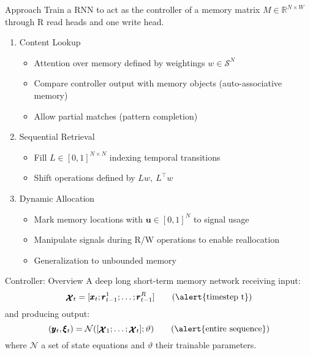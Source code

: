 \documentclass{beamer}
\newcommand{\xx}{\pmb{\raisebox{-1.5pt}{$\mathcal{X}$}}}
\begin{document}
\begin{frame}{Approach}
	Train a RNN to act as the \alert{controller} of a memory matrix $M \in \mathbb{R}^{N\times W}$ through R \alert{read heads} and one \alert{write head}.
	
	\pause
	\begin{enumerate}
	\item \alert{Content Lookup}\\
		\begin{itemize}
		\item \alert{Attention} over memory defined by weightings $w \in \mathcal{S}^N$
		\item Compare controller output with memory objects (\alert{auto-associative memory})
		\item Allow partial matches  (\alert{pattern completion})
		\end{itemize}
	\pause
	\item \alert{Sequential Retrieval}
		\begin{itemize} 
		\item Fill $L \in [0,1]^{N \times N}$ indexing \alert{temporal transitions}
		\item \alert{Shift} operations defined by $Lw,\ L^\top w$
		\end{itemize}
	\pause
	\item \alert{Dynamic Allocation}
		\begin{itemize}
		\item Mark memory locations with $\pmb{u} \in [0,1]^N$ to \alert{signal usage}
		\item Manipulate signals during R/W operations to enable \alert{reallocation}
		\item Generalization to \alert{unbounded memory}
		\end{itemize}
	\end{enumerate}
\end{frame}
	
\begin{frame}{Controller: Overview}
	A deep \alert{long short-term memory network} receiving input:
	\[
	\xx_t=[ \pmb{x}_t; \pmb{r}_{t-1}^1; \dots ;\pmb{r}_{t-1}^R] \tag{\text{\alert{timestep t}}}
	\]
	and producing output:
	\[
	(\pmb{y}_t,\pmb{\xi}_t)=\mathcal{N}([\xx_1;\dots;\xx_t];\vartheta) \tag{\text{\alert{entire sequence}}}
	\]
	where \alert{$\mathcal{N}$} a set of state equations and \alert{$\vartheta$} their trainable parameters.
\end{frame}
\end{document}
